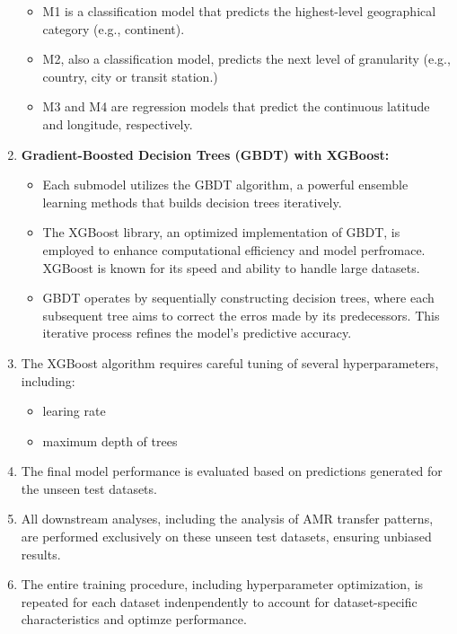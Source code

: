 \begin{enumerate}
    \begin{itemize}
        \item M1 is a classification model that predicts the highest-level geographical category (e.g., continent).
        \item M2, also a classification model, predicts the next level of granularity (e.g., country, city or transit station.)
        \item M3 and M4 are regression models that predict the continuous latitude and longitude, respectively.
    \end{itemize}
    \item \textbf{Gradient-Boosted Decision Trees (GBDT) with XGBoost:}
    \begin{itemize}
        \item Each submodel utilizes the GBDT algorithm, a powerful ensemble learning methods that builds decision trees iteratively.
        \item The XGBoost library, an optimized implementation of GBDT, is employed to enhance computational efficiency and model perfromace. XGBoost is known for its speed and ability to handle large datasets.
        \item GBDT operates by sequentially constructing decision trees, where each subsequent tree aims to correct the erros made by its predecessors.
        This iterative process refines the model's predictive accuracy.
    \end{itemize}
        \item The XGBoost algorithm requires careful tuning of several hyperparameters, including:
    \begin{itemize}
        \item learing rate
        \item maximum depth of trees
    \end{itemize}
    \item The final model performance is evaluated based on predictions generated for the unseen test datasets.
    \item All downstream analyses, including the analysis of AMR transfer patterns, are performed exclusively on these unseen test datasets, ensuring unbiased results.
    \item The entire training procedure, including hyperparameter optimization, is repeated for each dataset indenpendently to account for dataset-specific characteristics and optimze performance.   
\end{enumerate}
